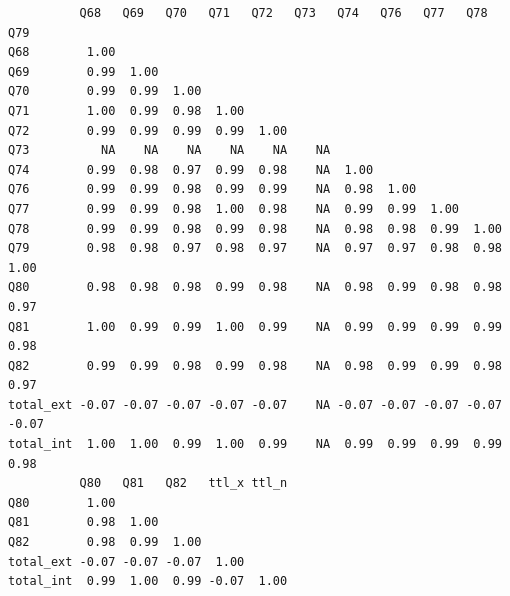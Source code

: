 \documentclass[
]{report}
\newenvironment{Shaded}{\begin{snugshade}}{\end{snugshade}}
\newcommand{\AttributeTok}[1]{\textcolor[rgb]{0.77,0.63,0.00}{#1}}
\newcommand{\CommentTok}[1]{\textcolor[rgb]{0.56,0.35,0.01}{\textit{#1}}}
\newcommand{\ConstantTok}[1]{\textcolor[rgb]{0.00,0.00,0.00}{#1}}
\newcommand{\DecValTok}[1]{\textcolor[rgb]{0.00,0.00,0.81}{#1}}
\newcommand{\FunctionTok}[1]{\textcolor[rgb]{0.00,0.00,0.00}{#1}}
\newcommand{\NormalTok}[1]{#1}
\newcommand{\OtherTok}[1]{\textcolor[rgb]{0.56,0.35,0.01}{#1}}
\newcommand{\SpecialCharTok}[1]{\textcolor[rgb]{0.00,0.00,0.00}{#1}}
\begin{document}
\begin{Shaded}
\end{Shaded}

\begin{verbatim}
          Q68   Q69   Q70   Q71   Q72   Q73   Q74   Q76   Q77   Q78   Q79  
Q68        1.00                                                            
Q69        0.99  1.00                                                      
Q70        0.99  0.99  1.00                                                
Q71        1.00  0.99  0.98  1.00                                          
Q72        0.99  0.99  0.99  0.99  1.00                                    
Q73          NA    NA    NA    NA    NA    NA                              
Q74        0.99  0.98  0.97  0.99  0.98    NA  1.00                        
Q76        0.99  0.99  0.98  0.99  0.99    NA  0.98  1.00                  
Q77        0.99  0.99  0.98  1.00  0.98    NA  0.99  0.99  1.00            
Q78        0.99  0.99  0.98  0.99  0.98    NA  0.98  0.98  0.99  1.00      
Q79        0.98  0.98  0.97  0.98  0.97    NA  0.97  0.97  0.98  0.98  1.00
Q80        0.98  0.98  0.98  0.99  0.98    NA  0.98  0.99  0.98  0.98  0.97
Q81        1.00  0.99  0.99  1.00  0.99    NA  0.99  0.99  0.99  0.99  0.98
Q82        0.99  0.99  0.98  0.99  0.98    NA  0.98  0.99  0.99  0.98  0.97
total_ext -0.07 -0.07 -0.07 -0.07 -0.07    NA -0.07 -0.07 -0.07 -0.07 -0.07
total_int  1.00  1.00  0.99  1.00  0.99    NA  0.99  0.99  0.99  0.99  0.98
          Q80   Q81   Q82   ttl_x ttl_n
Q80        1.00                        
Q81        0.98  1.00                  
Q82        0.98  0.99  1.00            
total_ext -0.07 -0.07 -0.07  1.00      
total_int  0.99  1.00  0.99 -0.07  1.00
\end{verbatim}
\end{document}
